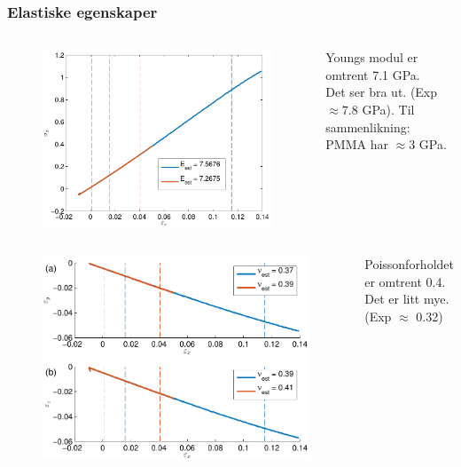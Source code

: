 \documentclass[utf8x, notes, graphics]{beamer}
\begin{document}
\begin{frame}
\frametitle{Elastiske egenskaper}
{
	\begin{columns}
	\begin{figure}
		\includegraphics[width=\textwidth]{../figures/thesis/stress_strain_11_11_11_tip4p_ice_uam.pdf}
	\end{figure}
	Youngs modul er omtrent 7.1 GPa.\\
	\vspace{3mm}
	Det ser bra ut. (Exp $\approx 7.8$ GPa).
	\vspace{3mm}
	Til sammenlikning: PMMA har $\approx 3$ GPa.
	\end{columns}
}
{
	\begin{columns}
	\column{0.7\textwidth}
	\begin{figure}
		\includegraphics[width=\textwidth]{../figures/thesis/strain_strain_11_11_11_y_z_poisson_tip4p_ice_uam.pdf}
	\end{figure}
	\column{0.3\textwidth}
	Poissonforholdet er omtrent 0.4.\\
	\vspace{3mm}
	Det er litt mye. (Exp $\approx$ 0.32)
	\end{columns}
}
\end{frame}
\end{document}

